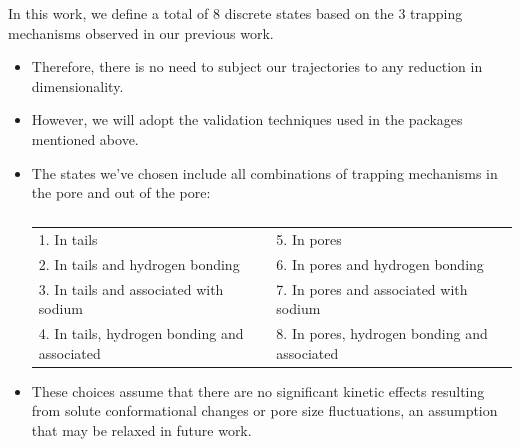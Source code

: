 \documentclass{article}
\begin{document}
  In this work, we define a total of 8 discrete states based on the 3 trapping
  mechanisms observed in our previous work. 
  \begin{itemize}
  	\item Therefore, there is no need to subject our trajectories to any reduction
  	in dimensionality. 
  	\item However, we will adopt the validation techniques used in the packages
  	mentioned above.  
  	\item The states we've chosen include all combinations of trapping mechanisms 
  	in the pore and out of the pore:
    \begin{table}[!htb]
	  \centering
	  \begin{tabular}{ll}
	  \hline
	  1. In tails                                  & 5. In pores                                  \\
	  2. In tails and hydrogen bonding             & 6. In pores and hydrogen bonding             \\
	  3. In tails and associated with sodium       & 7. In pores and associated with sodium       \\
	  4. In tails, hydrogen bonding and associated & 8. In pores, hydrogen bonding and associated \\
	  \hline
	  \end{tabular}
	  \caption{}\label{table:water_content}
   \end{table}
  	\item These choices assume that there are no significant kinetic effects resulting
  	from solute conformational changes or pore size fluctuations, an assumption 
  	that may be relaxed in future work.
  \end{itemize}
  
\end{document}
